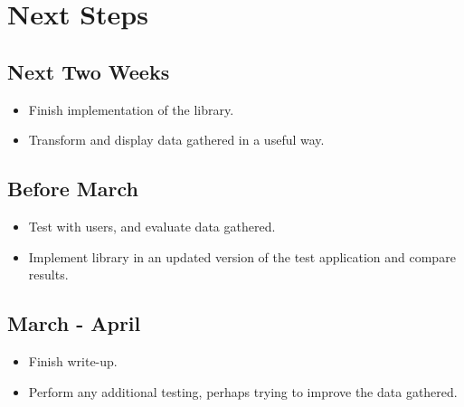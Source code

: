 \section{Next Steps}

\subsection{Next Two Weeks}
\begin{itemize}
\item
Finish implementation of the library.
\item
Transform and display data gathered in a useful way.
\end{itemize}

\subsection{Before March}
\begin{itemize}
\item
Test with users, and evaluate data gathered.
\item
Implement library in an updated version of the test application and compare results.
\end{itemize}

\subsection{March - April}
\begin{itemize}
\item
Finish write-up.
\item
Perform any additional testing, perhaps trying to improve the data gathered.
\end{itemize}

